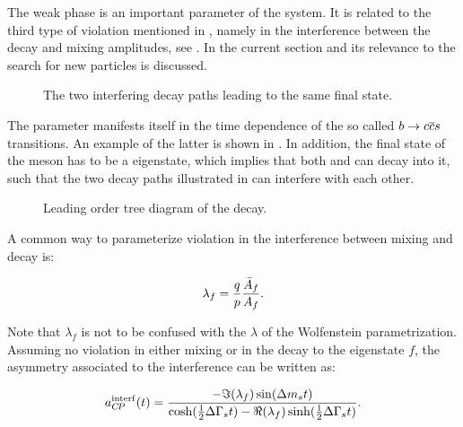 The weak phase \phis is an important parameter of the \BBbarSyst system. It is related to the third
type of \CP violation mentioned in , namely in the interference between
the decay and mixing amplitudes, see . In the current section \phis and
its relevance to the search for new particles is discussed.

\newcommand{\ffig}{f}
\begin{figure}[h]
  \centering
  \resizebox{0.4\textwidth}{!}{}
  \caption{The two interfering decay paths leading to the same final state.}
  \label{interference}
\end{figure}

The parameter \phis manifests itself in the time dependence of the so called $b \rightarrow c\overline {c}s $ transitions.
An example of the latter is shown in . In addition, the final state of the \Bs meson has to be
a \CP eigenstate, which implies that both \Bs and \Bsb can decay into it, such that the two decay paths
illustrated in  can interfere with each other.

\begin{figure}[!h]
  \centering
  {\sffamily }
  \caption{Leading order tree diagram of the \BsJpsiPhi decay.}
  \label{bs2jpsiphi}
\end{figure}

A common way to parameterize \CP violation in the interference between mixing and decay is:

\begin{equation}
  \centering
  \lambda_{f} = \frac{q}{p} \frac{\bar{A}_f}{A_f}. %
\label{lambda_cpv}
\end{equation}

\noindent Note that $\lambda_f$ is not to be confused with the $\lambda$ of the Wolfenstein parametrization.
Assuming no \CP violation in either \BBbarSyst mixing or in the decay to the \CP eigenstate $f$, the asymmetry
associated to the interference can be written as:

\newcommand{\half}{\frac{1}{2}}
\begin{equation}
  \centering
  a_{\CP}^{\rm interf}(t) = \frac{ - \Im(\lambda_f) \sin(\Delta m_s t)} {\cosh(\half \Delta\Gamma_s t) - \Re(\lambda_f)\sinh(\half\Delta\Gamma_s t)}.
\label{cpv_interf}
\end{equation}

